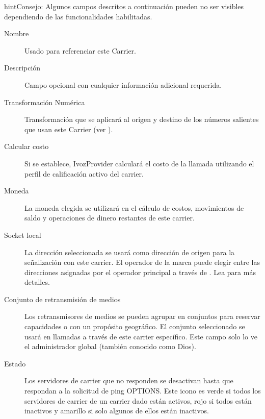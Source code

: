 \documentclass[letterpaper,10pt,spanish]{sphinxmanual}
\begin{document}
\begin{notice}{hint}{Consejo:}
Algunos campos descritos a continuación pueden no ser visibles dependiendo de las funcionalidades habilitadas.
\begin{description}
\item[{Nombre}] \leavevmode
Usado para referenciar este Carrier.

\item[{Descripción}] \leavevmode
Campo opcional con cualquier información adicional requerida.

\item[{Transformación Numérica}] \leavevmode
Transformación que se aplicará al origen y destino de los números salientes que usan este Carrier (ver {\hyperref[administration_portal/brand/settings/numeric_transformations:numeric\string-transformations]{}}).

\item[{Calcular costo}] \leavevmode
Si se establece, IvozProvider calculará el costo de la llamada utilizando el perfil de calificación activo del carrier.

\item[{Moneda}] \leavevmode
La moneda elegida se utilizará en el cálculo de costos, movimientos de saldo y operaciones de dinero restantes de este carrier.

\item[{Socket local}] \leavevmode
La dirección seleccionada se usará como dirección de origen para la señalización con este carrier. El operador de la marca puede elegir entre las direcciones asignadas por el operador principal a través de {\hyperref[administration_portal/platform/brands:brands]{}}. Lea {\hyperref[administration_portal/platform/infrastructure/proxy_trunks:proxy\string-trunks]{}} para más detalles.

\item[{Conjunto de retransmisión de medios}] \leavevmode
Los retransmisores de medios se pueden agrupar en conjuntos para reservar capacidades o con un propósito geográfico. El conjunto seleccionado se usará en llamadas a través de este carrier específico. Este campo solo lo ve el administrador global (también conocido como Dios).

\item[{Estado}] \leavevmode
Los servidores de carrier que no responden se desactivan hasta que respondan a la solicitud de ping OPTIONS. Este icono es verde si todos los servidores de carrier de un carrier dado están activos, rojo si todos están inactivos y amarillo si solo algunos de ellos están inactivos.

\end{description}
\end{notice}
\end{document}

